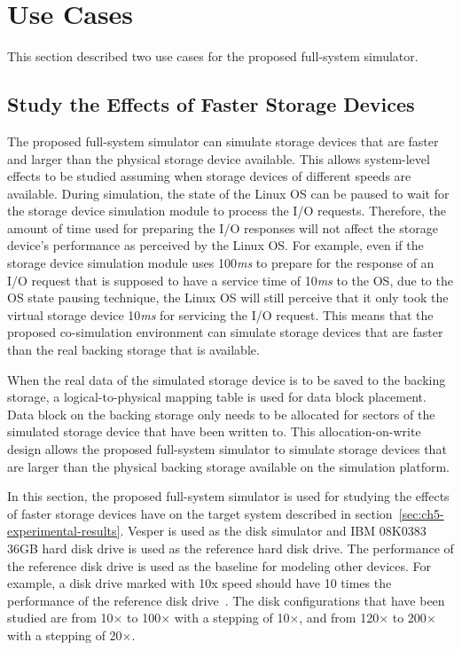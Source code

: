 \section{Use Cases}
\label{sec:use-case}

This section described two use cases for the proposed full-system simulator.

\subsection{Study the Effects of Faster Storage Devices}

The proposed full-system simulator can simulate storage devices that are faster and larger than the physical storage device available. This allows system-level effects to be studied assuming when storage devices of different speeds are available. During simulation, the state of the Linux OS can be paused to wait for the storage device simulation module to process the I/O requests. Therefore, the amount of time used for preparing the I/O responses will not affect the storage device's performance as perceived by the Linux OS. For example, even if the storage device simulation module uses 100\textit{ms} to prepare for the response of an I/O request that is supposed to have a service time of 10\textit{ms} to the OS, due to the OS state pausing technique, the Linux OS will still perceive that it only took the virtual storage device 10\textit{ms} for servicing the I/O request. This means that the proposed co-simulation environment can simulate storage devices that are faster than the real backing storage that is available.

When the real data of the simulated storage device is to be saved to the backing storage, a logical-to-physical mapping table is used for data block placement. Data block on the backing storage only needs to be allocated for sectors of the simulated storage device that have been written to. This allocation-on-write design allows the proposed full-system simulator to simulate storage devices that are larger than the physical backing storage available on the simulation platform.

In this section, the proposed full-system simulator is used for studying the effects of faster storage devices have on the target system described in section~\ref{sec:ch5-experimental-results}. Vesper is used as the disk simulator and IBM 08K0383 36GB hard disk drive is used as the reference hard disk drive. The performance of the reference disk drive is used as the baseline for modeling other devices. For example, a disk drive marked with 10x speed should have 10 times the performance of the reference disk drive~\cite{Ruemmler:1994}. The disk configurations that have been studied are from 10$\times$ to 100$\times$ with a stepping of 10$\times$, and from 120$\times$ to 200$\times$ with a stepping of 20$\times$.

